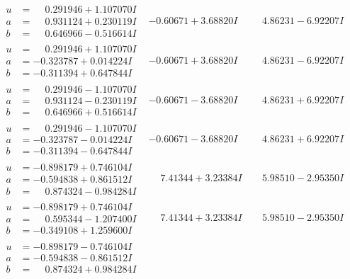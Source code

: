 \documentclass[1p]{elsarticle_modified}
\theoremstyle{definition}
\begin{document}
$$\begin{array}{c|c|c}
\begin{aligned}
u &= \phantom{-}0.291946 + 1.107070 I \\
a &= \phantom{-}0.931124 + 0.230119 I \\
b &= \phantom{-}0.646966 - 0.516614 I\end{aligned}
 & -0.60671 + 3.68820 I & \phantom{-}4.86231 - 6.92207 I \\ \hline\begin{aligned}
u &= \phantom{-}0.291946 + 1.107070 I \\
a &= -0.323787 + 0.014224 I \\
b &= -0.311394 + 0.647844 I\end{aligned}
 & -0.60671 + 3.68820 I & \phantom{-}4.86231 - 6.92207 I \\ \hline\begin{aligned}
u &= \phantom{-}0.291946 - 1.107070 I \\
a &= \phantom{-}0.931124 - 0.230119 I \\
b &= \phantom{-}0.646966 + 0.516614 I\end{aligned}
 & -0.60671 - 3.68820 I & \phantom{-}4.86231 + 6.92207 I \\ \hline\begin{aligned}
u &= \phantom{-}0.291946 - 1.107070 I \\
a &= -0.323787 - 0.014224 I \\
b &= -0.311394 - 0.647844 I\end{aligned}
 & -0.60671 - 3.68820 I & \phantom{-}4.86231 + 6.92207 I \\ \hline\begin{aligned}
u &= -0.898179 + 0.746104 I \\
a &= -0.594838 + 0.861512 I \\
b &= \phantom{-}0.874324 - 0.984284 I\end{aligned}
 & \phantom{-}7.41344 + 3.23384 I & \phantom{-}5.98510 - 2.95350 I \\ \hline\begin{aligned}
u &= -0.898179 + 0.746104 I \\
a &= \phantom{-}0.595344 - 1.207400 I \\
b &= -0.349108 + 1.259600 I\end{aligned}
 & \phantom{-}7.41344 + 3.23384 I & \phantom{-}5.98510 - 2.95350 I \\ \hline\begin{aligned}
u &= -0.898179 - 0.746104 I \\
a &= -0.594838 - 0.861512 I \\
b &= \phantom{-}0.874324 + 0.984284 I\end{aligned}

\end{array}$$
\end{document}
